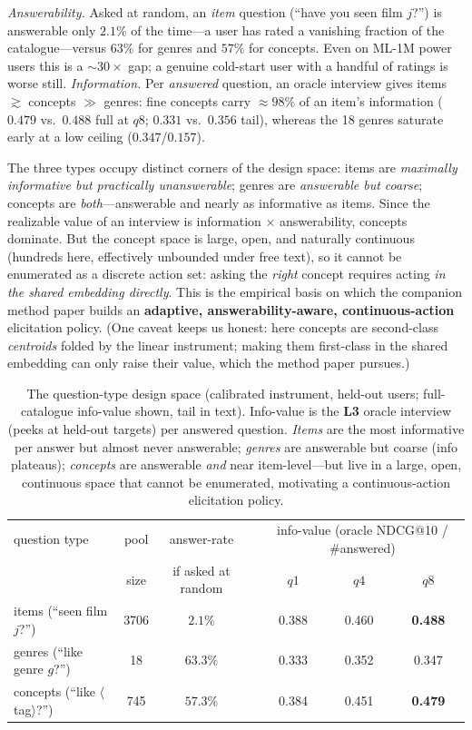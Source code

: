 \documentclass[11pt]{article}
\begin{document}
\emph{Answerability.} Asked at random, an \emph{item} question (``have you seen film $j$?'') is answerable only $2.1\%$
of the time---a user has rated a vanishing fraction of the catalogue---versus $63\%$ for genres and $57\%$ for
concepts. Even on ML-1M power users this is a $\sim\!30\times$ gap; a genuine cold-start user with a handful of ratings
is worse still. \emph{Information.} Per \emph{answered} question, an oracle interview gives items $\gtrsim$ concepts
$\gg$ genres: fine concepts carry $\approx\!98\%$ of an item's information ($0.479$ vs.\ $0.488$ full at $q8$; $0.331$
vs.\ $0.356$ tail), whereas the 18 genres saturate early at a low ceiling ($0.347$/$0.157$).

The three types occupy distinct corners of the design space: items are \emph{maximally informative but practically
unanswerable}; genres are \emph{answerable but coarse}; concepts are \emph{both}---answerable and nearly as
informative as items. Since the realizable value of an interview is information $\times$ answerability, concepts
dominate. But the concept space is large, open, and naturally continuous (hundreds here, effectively unbounded under
free text), so it cannot be enumerated as a discrete action set: asking the \emph{right} concept requires acting
\emph{in the shared embedding directly}. This is the empirical basis on which the companion method paper builds an
\textbf{adaptive, answerability-aware, continuous-action} elicitation policy. (One caveat keeps us honest: here
concepts are second-class \emph{centroids} folded by the linear instrument; making them first-class in the shared
embedding can only raise their value, which the method paper pursues.)

\begin{table}[h]\centering\small
\begin{tabular}{lcc c ccc}
\toprule
question type & pool & answer-rate & & \multicolumn{3}{c}{info-value (oracle NDCG@10 / \#answered)}\\
 & size & if asked at random & & $q1$ & $q4$ & $q8$\\
\midrule
items (``seen film $j$?'') & 3706 & $2.1\%$ & & 0.388 & 0.460 & \textbf{0.488}\\
genres (``like genre $g$?'') & 18 & $63.3\%$ & & 0.333 & 0.352 & 0.347\\
concepts (``like $\langle$tag$\rangle$?'') & 745 & $57.3\%$ & & 0.384 & 0.451 & \textbf{0.479}\\
\bottomrule
\end{tabular}
\caption{The question-type design space (calibrated instrument, held-out users; full-catalogue info-value shown, tail
in text). Info-value is the \textbf{L3} oracle interview (peeks at held-out targets) per answered question. \emph{Items} are the most informative per answer but almost never answerable; \emph{genres} are answerable
but coarse (info plateaus); \emph{concepts} are answerable \emph{and} near item-level---but live in a large, open,
continuous space that cannot be enumerated, motivating a continuous-action elicitation policy.}
\label{tab:answer}
\end{table}
\end{document}
